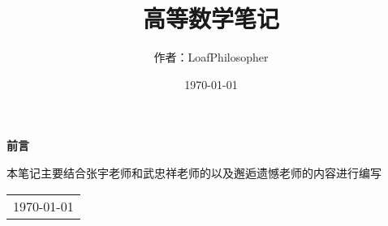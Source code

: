 \title{{\Huge{\textbf{高等数学笔记}}}}
\author{作者：LoafPhilosopher }
\date{\today}
\maketitle                   %

\thispagestyle{empty}        %
\begin{center}
	\Huge\textbf{前言}
\end{center}

本笔记主要结合张宇老师和武忠祥老师的以及邂逅遗憾老师的内容进行编写
\begin{flushright}
	\begin{tabular}{c}
		\today \newline 
	\end{tabular}
\end{flushright}

\newpage                      %
\pagestyle{plain}             %
\setcounter{page}{1}          %


\tableofcontents              %
\newpage                      %
\pagestyle{plain}
\setcounter{page}{1}          %
